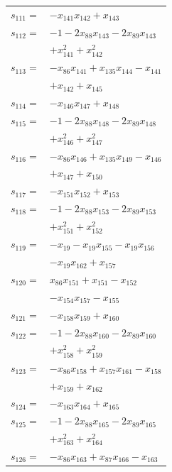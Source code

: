 \begin{longtable}{@{}r@{\;}l@{}}
\(s_{111}=\) & \(\displaystyle -x_{141}x_{142} +x_{143}\) \\[3pt]
\(s_{112}=\) & \(\displaystyle -1 -2x_{88}x_{143} -2x_{89}x_{143}\) \\
 & \(\displaystyle +x_{141}^{2} +x_{142}^{2}\) \\[3pt]
\(s_{113}=\) & \(\displaystyle -x_{86}x_{141} +x_{135}x_{144} -x_{141}\) \\
 & \(\displaystyle +x_{142} +x_{145}\) \\[3pt]
\(s_{114}=\) & \(\displaystyle -x_{146}x_{147} +x_{148}\) \\[3pt]
\(s_{115}=\) & \(\displaystyle -1 -2x_{88}x_{148} -2x_{89}x_{148}\) \\
 & \(\displaystyle +x_{146}^{2} +x_{147}^{2}\) \\[3pt]
\(s_{116}=\) & \(\displaystyle -x_{86}x_{146} +x_{135}x_{149} -x_{146}\) \\
 & \(\displaystyle +x_{147} +x_{150}\) \\[3pt]
\(s_{117}=\) & \(\displaystyle -x_{151}x_{152} +x_{153}\) \\[3pt]
\(s_{118}=\) & \(\displaystyle -1 -2x_{88}x_{153} -2x_{89}x_{153}\) \\
 & \(\displaystyle +x_{151}^{2} +x_{152}^{2}\) \\[3pt]
\(s_{119}=\) & \(\displaystyle -x_{19} -x_{19}x_{155} -x_{19}x_{156}\) \\
 & \(\displaystyle -x_{19}x_{162} +x_{157}\) \\[3pt]
\(s_{120}=\) & \(\displaystyle x_{86}x_{151} +x_{151} -x_{152}\) \\
 & \(\displaystyle -x_{154}x_{157} -x_{155}\) \\[3pt]
\(s_{121}=\) & \(\displaystyle -x_{158}x_{159} +x_{160}\) \\[3pt]
\(s_{122}=\) & \(\displaystyle -1 -2x_{88}x_{160} -2x_{89}x_{160}\) \\
 & \(\displaystyle +x_{158}^{2} +x_{159}^{2}\) \\[3pt]
\(s_{123}=\) & \(\displaystyle -x_{86}x_{158} +x_{157}x_{161} -x_{158}\) \\
 & \(\displaystyle +x_{159} +x_{162}\) \\[3pt]
\(s_{124}=\) & \(\displaystyle -x_{163}x_{164} +x_{165}\) \\[3pt]
\(s_{125}=\) & \(\displaystyle -1 -2x_{88}x_{165} -2x_{89}x_{165}\) \\
 & \(\displaystyle +x_{163}^{2} +x_{164}^{2}\) \\[3pt]
\(s_{126}=\) & \(\displaystyle -x_{86}x_{163} +x_{87}x_{166} -x_{163}\) \\

\end{longtable}
